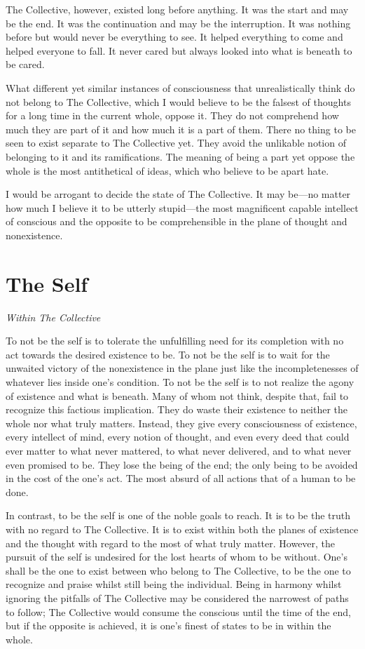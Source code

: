 \documentclass[oneside]{book}
\begin{document}
The Collective, however, existed long before anything. It was the start and may
be the end. It was the continuation and may be the interruption. It was nothing
before but would never be everything to see. It helped everything to come and
helped everyone to fall. It never cared but always looked into what is beneath
to be cared.

What different yet similar instances of consciousness that unrealistically think
do not belong to The Collective, which I would believe to be the falsest of
thoughts for a long time in the current whole, oppose it. They do not comprehend
how much they are part of it and how much it is a part of them. There no thing
to be seen to exist separate to The Collective yet. They avoid the unlikable
notion of belonging to it and its ramifications. The meaning of being a part yet
oppose the whole is the most antithetical of ideas, which who believe to be
apart hate.

I would be arrogant to decide the state of The Collective. It may be—no matter
how much I believe it to be utterly stupid—the most magnificent capable
intellect of conscious and the opposite to be comprehensible in the plane of
thought and nonexistence.

\section{The Self}
\textit{Within The Collective}

To not be the self is to tolerate the unfulfilling need for its
completion with no act towards the desired existence to be. To not be the self
is to wait for the unwaited victory of the nonexistence in the plane just like
the incompletenesses of whatever lies inside one's condition. To not be the self
is to not realize the agony of existence and what is beneath. Many of whom not
think, despite that, fail to recognize this factious implication. They do waste
their existence to neither the whole nor what truly matters. Instead, they give
every consciousness of existence, every intellect of mind, every notion of
thought, and even every deed that could ever matter to what never mattered, to
what never delivered, and to what never even promised to be. They lose the being
of the end; the only being to be avoided in the cost of the one's act. The most
absurd of all actions that of a human to be done.

In contrast, to be the self is one of the noble goals to reach. It is to be the
truth with no regard to The Collective. It is to exist within both the planes of
existence and the thought with regard to the most of what truly matter. However,
the pursuit of the self is undesired for the lost hearts of whom to be without.
One's shall be the one to exist between who belong to The Collective, to be the
one to recognize and praise whilst still being the individual. Being in harmony
whilst ignoring the pitfalls of The Collective may be considered the narrowest
of paths to follow; The Collective would consume the conscious until the time of
the end, but if the opposite is achieved, it is one's finest of states to be in
within the whole.
\end{document}
